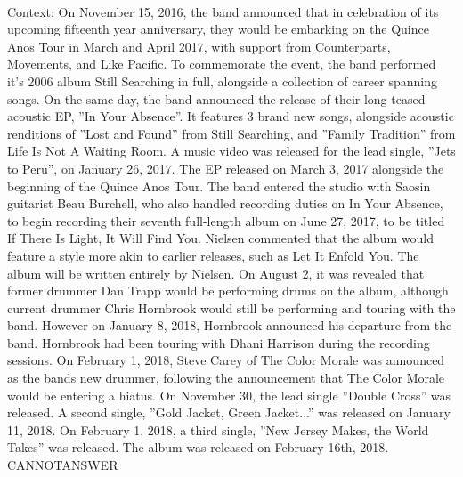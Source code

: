 \documentclass[11pt,a4paper, onecolumn]{article}
\begin{document}
\\ Context: On November 15, 2016, the band announced that in celebration of its upcoming fifteenth year anniversary, they would be embarking on the Quince Anos Tour in March and April 2017, with support from Counterparts, Movements, and Like Pacific. To commemorate the event, the band performed it's 2006 album Still Searching in full, alongside a collection of career spanning songs. On the same day, the band announced the release of their long teased acoustic EP, ''In Your Absence''. It features 3 brand new songs, alongside acoustic renditions of ''Lost and Found'' from Still Searching, and ''Family Tradition'' from Life Is Not A Waiting Room. A music video was released for the lead single, ''Jets to Peru'', on January 26, 2017. The EP released on March 3, 2017 alongside the beginning of the Quince Anos Tour. The band entered the studio with Saosin guitarist Beau Burchell, who also handled recording duties on In Your Absence, to begin recording their seventh full-length album on June 27, 2017, to be titled If There Is Light, It Will Find You. Nielsen commented that the album would feature a style more akin to earlier releases, such as Let It Enfold You. The album will be written entirely by Nielsen. On August 2, it was revealed that former drummer Dan Trapp would be performing drums on the album, although current drummer Chris Hornbrook would still be performing and touring with the band. However on January 8, 2018, Hornbrook announced his departure from the band. Hornbrook had been touring with Dhani Harrison during the recording sessions. On February 1, 2018, Steve Carey of The Color Morale was announced as the bands new drummer, following the announcement that The Color Morale would be entering a hiatus. On November 30, the lead single ''Double Cross'' was released. A second single, ''Gold Jacket, Green Jacket...'' was released on January 11, 2018. On February 1, 2018, a third single, ''New Jersey Makes, the World Takes'' was released. The album was released on February 16th, 2018. CANNOTANSWER
\end{document}
